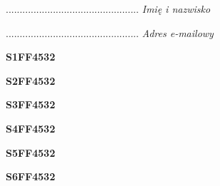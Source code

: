 \begin{turn}{90}\begin{minipage}{\linewidth} \vspace{20mm} ................................................  \textit{Imię i nazwisko}\end{minipage}\end{turn}

\begin{turn}{90}\begin{minipage}{\linewidth} \vspace{20mm} ................................................  \textit{Adres e-mailowy}\end{minipage}\end{turn}

\begin{turn}{90}\huge \begin{minipage}{\linewidth} \vspace{10mm}\textbf{S1FF4532}\end{minipage}\end{turn}

\begin{turn}{90}\huge \begin{minipage}{\linewidth} \vspace{10mm}\textbf{S2FF4532}\end{minipage}\end{turn}

\begin{turn}{90}\huge \begin{minipage}{\linewidth} \vspace{10mm}\textbf{S3FF4532}\end{minipage}\end{turn}

\begin{turn}{90}\huge \begin{minipage}{\linewidth} \vspace{10mm}\textbf{S4FF4532}\end{minipage}\end{turn}

\begin{turn}{90}\huge \begin{minipage}{\linewidth} \vspace{10mm}\textbf{S5FF4532}\end{minipage}\end{turn}

\begin{turn}{90}\huge \begin{minipage}{\linewidth} \vspace{10mm}\textbf{S6FF4532}\end{minipage}\end{turn}

